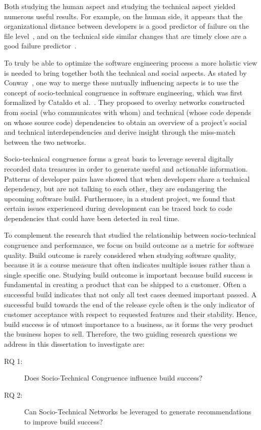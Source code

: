 Both studying the human aspect and studying the technical aspect yielded numerous useful results.
For example, on the human side, it appears that the organizational distance between developers is a good predictor of failure on the file level~\cite{nagappan:icse:2008}, and on the technical side similar changes that are timely close are a good failure predictor~\cite{kim:icse:2007}.

To truly be able to optimize the software engineering process a more holistic view is needed to bring together both the technical and social aspects.
As stated by Conway~\cite{conway:datamination:1968}, one way to merge these mutually influencing aspects is to use the concept of socio-technical congruence in software engineering, which was first formalized by Cataldo et al.~\cite{cataldo:cscw:2006}.
They proposed to overlay networks constructed from social (who communicates with whom) and technical (whose code depends on whose source code) dependencies to obtain an overview of a project's social and technical interdependencies and derive insight through the miss-match between the two networks.



Socio-technical congruence forms a great basis to leverage several digitally recorded data treasures in order to generate useful and actionable information.
Patterns of developer pairs have showed that when developers share a technical dependency, but are not talking to each other, they are endangering the upcoming software build.
Furthermore, in a student project, we found that certain issues experienced during development can be traced back to code dependencies that could have been detected in real time.

To complement the research that studied the relationship between socio-technical congruence and performance, we focus on build outcome as a metric for software quality.
Build outcome is rarely considered when studying software quality, because it is a course measure that often indicates multiple issues rather than a single specific one.
Studying build outcome is important because build success is fundamental in creating a product that can be shipped to a customer.
Often a successful build indicates that not only all test cases deemed important passed.
A successful build towards the end of the release cycle often is the only indicator of customer acceptance with respect to requested features and their stability.
Hence, build success is of utmost importance to a business, as it forms the very product the business hopes to sell.
Therefore, the two guiding research questions we address in this dissertation to investigate are:
\begin{description}
\item[RQ 1:] Does Socio-Technical Congruence influence build success?
\item[RQ 2:] Can Socio-Technical Networks be leveraged to generate recommendations to improve build success?
\end{description}

